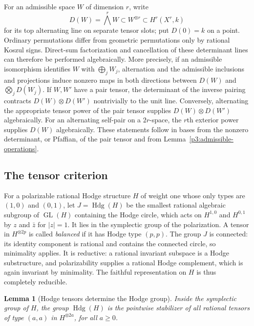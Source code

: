 \documentclass[11pt]{article}
\newtheorem{lemma}[theorem]{Lemma}
\numberwithin{equation}{section}
\begin{document}
For an admissible space $W$ of dimension $r$, write
\[
 D(W)=\bigwedge^r W\subset W^{\otimes r}
       \subset H^r(X^r,k)
\]
for its top alternating line on separate tensor slots; put $D(0)=k$
on a point.  Ordinary permutations differ from geometric permutations
only by rational Koszul signs.  Direct-sum factorization and
cancellation of these determinant lines can therefore be performed
algebraically.  More precisely, if an admissible isomorphism identifies
$W$ with $\bigoplus_j W_j$, alternation and the admissible
inclusions and projections induce nonzero maps in both directions
between $D(W)$ and $\bigotimes_jD(W_j)$.  If $W,W'$ have a
pair tensor, the determinant of the inverse pairing contracts
$D(W)\otimes D(W')$ nontrivially to the unit line.  Conversely,
alternating the appropriate tensor power of the pair tensor supplies
$D(W)\otimes D(W')$ algebraically.  For an alternating self-pair
on a $2r$-space, the $r$th exterior power supplies $D(W)$
algebraically.  These statements follow in bases from the nonzero
determinant, or Pfaffian, of the pair tensor and from
Lemma~\ref{p3:admissible-operations}.

\subsection{The tensor criterion}

For a polarizable rational Hodge structure $H$ of weight one
whose only types are $(1,0)$ and $(0,1)$, let
$J=\operatorname{Hdg}(H)$ be the smallest rational algebraic
subgroup of $\operatorname{GL}(H)$ containing the Hodge circle,
which acts on $H^{1,0}$ and $H^{0,1}$ by $z$ and $\bar z$
for $|z|=1$.  It lies in the symplectic group of the polarization.
A tensor in $H^{\otimes 2p}$ is called \emph{balanced} if it
has Hodge type $(p,p)$.
The group $J$ is connected: its identity component is rational and contains
the connected circle, so minimality applies.  It is reductive:
a rational invariant subspace is a Hodge substructure, and
polarizability supplies a rational Hodge complement, which is
again invariant by minimality.  The faithful representation on
$H$ is thus completely reducible.

\begin{lemma}[Hodge tensors determine the Hodge group]
\label{p3:tensor-stabilizer}
Inside the symplectic group of $H$, the group
$\operatorname{Hdg}(H)$ is the pointwise stabilizer of all rational
tensors of type $(a,a)$ in $H^{\otimes 2a}$, for all $a\ge0$.
\end{lemma}
\end{document}
